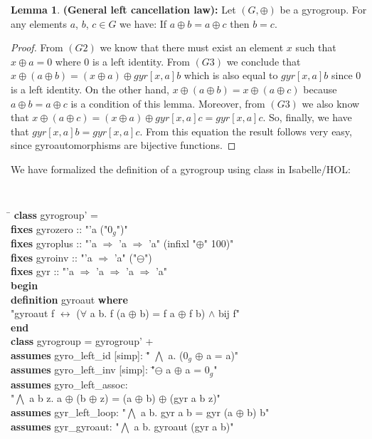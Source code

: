 \documentclass[a4paper]{article}
\newcommand{\tab}{\hspace{5mm}}
\theoremstyle{definition}
\newtheorem{lemma}[theorem]{Lemma}
\begin{document}
\begin{lemma} \textbf{(General left cancellation law):} Let $(G,\oplus)$ be a gyrogroup. For any elements $a$, $b$, $c\in G$ we have: If $a\oplus b=a\oplus c$ then $b=c$.
\end{lemma}
\begin{proof} From $(G2)$ we know that there must exist an element $x$ such that $x\oplus a = 0$ where $0$ is a left identity. From $(G3)$ we conclude that $x\oplus (a\oplus b) = (x \oplus a) \oplus gyr[x,a]b$ which is also equal to $gyr[x,a]b$ since $0$ is a left identity. On the other hand, $x\oplus (a\oplus b)=x\oplus (a\oplus c)$ because $a\oplus b=a\oplus c$ is a condition of this lemma. Moreover, from $(G3)$ we also know that  $x\oplus (a\oplus c) = (x \oplus a) \oplus gyr[x,a]c = gyr[x,a]c$. So, finally, we have that $gyr[x,a]b=gyr[x,a]c$. From this equation the result follows very easy, since gyroautomorphisms are bijective functions.
\end{proof}

We have formalized the definition of a gyrogroup using class in Isabelle/HOL:
\begin{small}
{\tt
\begin{tabbing}
\hspace{5mm}\=\kill
{\bf class} gyrogroup' =\\
\> {\bf fixes} gyrozero :: "'a ("$0_g$")" 
\\
\> {\bf fixes} gyroplus :: "'a  $\Rightarrow$  'a  $\Rightarrow$  'a" (infixl "$\oplus$" 100)"\\
\> {\bf fixes} gyroinv :: "'a $\Rightarrow$ 'a" ("$\ominus$")\\
\> {\bf fixes} gyr :: "'a $\Rightarrow$ 'a $\Rightarrow$ 'a $\Rightarrow$ 'a" \\
{\bf begin}\\[2mm]
{\bf definition} gyroaut {\bf where}\\
\>    "gyroaut f $\longleftrightarrow$ 
       ($\forall$ a b. f (a $\oplus$ b) = f a $\oplus$ f b) $\land$ 
       bij f"\\[2mm]
{\bf end}\\


{\bf class}  gyrogroup  =  gyrogroup'  +\\
\> {\bf assumes} gyro\_left\_id [simp]: "\= $\bigwedge$ a. ($0_g$ $\oplus$ a = a)"\\
\> {\bf assumes} gyro\_left\_inv [simp]: "\=$\ominus$ a $\oplus$ a = $0_g$"\\
\> {\bf assumes} gyro\_left\_assoc: \\ \tab \tab "$\bigwedge$ a b z. a $\oplus$ (b $\oplus$ z) = (a $\oplus$ b) $\oplus$ (gyr a b z)"\\
\> {\bf assumes} gyr\_left\_loop: "$\bigwedge$ a b. gyr a b = gyr (a $\oplus$ b) b"\\
\> {\bf assumes} gyr\_gyroaut: "$\bigwedge$ a b. gyroaut (gyr a b)"\\

\end{tabbing}
}
\end{small}
\end{document}
